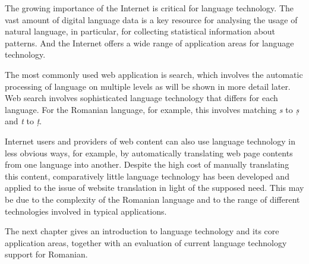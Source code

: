 \documentclass[]{../../metanetpaper}
\begin{document}
\begin{multicols}{2}

The growing importance of the Internet is critical for language technology. The vast amount of digital language data is a key resource for analysing the usage of natural language, in particular, for collecting statistical information about patterns. And the Internet offers a wide range of application areas for language technology. 

The most commonly used web application is search, which involves the automatic processing of language on multiple levels as will be shown in more detail later. Web search involves sophisticated language technology that differs for each language. For the Romanian language, for example, this involves matching \textit{s} to \textit{ș} and \textit{t} to \textit{ț}.

Internet users and providers of web content can also use language technology in less obvious ways, for example, by automatically translating web page contents from one language into another. Despite the high cost of manually translating this content, comparatively little language technology has been developed and applied to the issue of website translation in light of the supposed need. This may be due to the complexity of the Romanian language and to the range of different technologies involved in typical applications.

The next chapter gives an introduction to language technology and its core application areas, together with an evaluation of current language technology support for Romanian.

\end{multicols}

\clearpage

\end{document}
